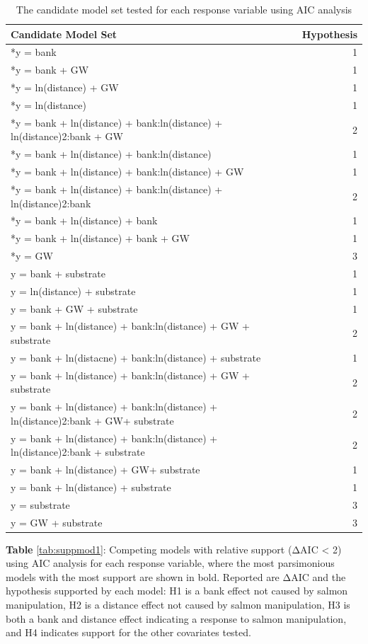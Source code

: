 \documentclass [11pt, proquest] {uwthesis}[2015/03/03]
\begin{document}
\begingroup\fontsize{10}{12}\selectfont
\begin{longtable}[t]{lr}
\caption{\label{tab:candmod1}The candidate model set tested for each response variable using AIC analysis}\\
\toprule
Candidate Model Set & Hypothesis\\
\midrule
*y = bank & 1\\
*y = bank + GW & 1\\
*y = ln(distance) + GW & 1\\
*y = ln(distance) & 1\\
*y = bank + ln(distance) + bank:ln(distance) + ln(distance)2:bank + GW & 2\\
\addlinespace
*y = bank + ln(distance) + bank:ln(distance) & 1\\
*y = bank + ln(distance) + bank:ln(distance) + GW & 1\\
*y = bank + ln(distance) + bank:ln(distance) + ln(distance)2:bank & 2\\
*y = bank + ln(distance) + bank & 1\\
*y = bank + ln(distance) + bank + GW & 1\\
\addlinespace
*y = GW & 3\\
y = bank + substrate & 1\\
y = ln(distance) + substrate & 1\\
y = bank + GW + substrate & 1\\
y = bank + ln(distance) + bank:ln(distance) + GW + substrate & 2\\
\addlinespace
y = bank + ln(distacne) + bank:ln(distance) + substrate & 1\\
y = bank + ln(distance) + bank:ln(distance) + GW + substrate & 2\\
y = bank + ln(distance) + bank:ln(distance) + ln(distance)2:bank + GW+ substrate & 2\\
y = bank + ln(distance) + bank:ln(distance) + ln(distance)2:bank + substrate & 2\\
y = bank + ln(distance) + GW+ substrate & 1\\
\addlinespace
y = bank + ln(distance) + substrate & 1\\
y = substrate & 3\\
y = GW + substrate & 3\\
\bottomrule
\end{longtable}
\endgroup{} \clearpage

\textbf{Table} \ref{tab:suppmod1}: Competing models with relative
support (ΔAIC \textless{} 2) using AIC analysis for each response
variable, where the most parsimonious models with the most support are
shown in bold. Reported are ΔAIC and the hypothesis supported by each
model: H1 is a bank effect not caused by salmon manipulation, H2 is a
distance effect not caused by salmon manipulation, H3 is both a bank and
distance effect indicating a response to salmon manipulation, and H4
indicates support for the other covariates tested.
\end{document}
